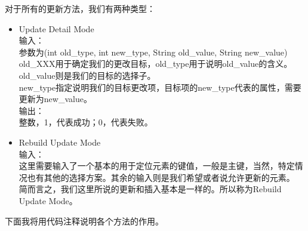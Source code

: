 \documentclass[../report.tex]{subfiles}
\begin{document}
\begin{enumerate}
对于所有的更新方法，我们有两种类型：
\begin{itemize}
\item 
Update Detail Mode\\
输入：\\
参数为(int old\_type, int new\_type, String old\_value, String new\_value)\\
old\_XXX用于确定我们的更改目标，old\_type用于说明old\_value的含义。old\_value则是我们的目标的选择子。\\
new\_type指定说明我们的目标更改项，目标项的new\_type代表的属性，需要更新为new\_value。\\
输出：\\
整数，1，代表成功；0，代表失败。
\item 
Rebuild Update Mode\\
输入：\\
这里需要输入了一个基本的用于定位元素的键值，一般是主键，当然，特定情况也有其他的选择方案。其余的输入则是我们希望或者说允许更新的元素。\\
简而言之，我们这里所说的更新和插入基本是一样的。所以称为Rebuild Update Mode。
\end{itemize}

\end{enumerate}

下面我将用代码注释说明各个方法的作用。
\end{document}
